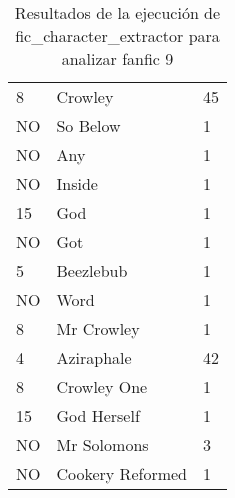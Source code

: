 \documentclass{pre-tfg}
\newcommand{\finalProgramName}{fic\_character\_extractor }
\begin{document}
\begin{table}[t]
{\begin{tabular}{lll}
		8       & Crowley        & 45     \\
		NO       & So Below        & 1     \\
		NO       & Any       & 1     \\
		NO       & Inside        & 1     \\
		15       & God        & 1     \\
		NO       & Got        & 1     \\
		5       & Beezlebub       & 1     \\
		NO       & Word        & 1     \\
		8       & Mr Crowley        & 1     \\
		4       & Aziraphale        & 42     \\
		8       & Crowley One        & 1     \\
		15       & God Herself        & 1     \\
		NO       & Mr Solomons        & 3     \\
		NO       & Cookery Reformed        & 1     \\
		
	\end{tabular}%
}
\caption{Resultados de la ejecución de \finalProgramName para analizar fanfic 9}
\label{table:eval1_nertagger}
\end{table}
\end{document}
